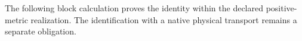 The following block calculation proves the identity within the declared
positive-metric realization. The identification with a native physical
transport remains a separate obligation.
